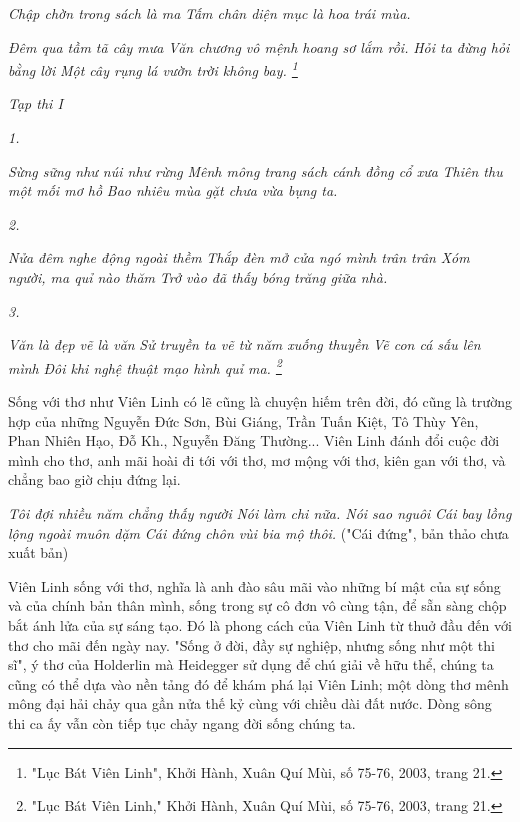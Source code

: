 \documentclass[../main.tex]{subfiles}
\begin{document}
\begin{multicols}{2}
\textit{Chập chờn trong sách là ma} 
\textit{Tấm chân diện mục là hoa trái mùa.} 

\textit{Đêm qua tầm tã cây mưa} 
\textit{Văn chương vô mệnh hoang sơ lắm rồi.} 
\textit{Hỏi ta đừng hỏi bằng lời} 
\textit{Một cây rụng lá vườn trời không bay. \footnote{
"Lục Bát Viên Linh", Khởi Hành, Xuân Quí Mùi, số 75-76, 2003, trang 21.} }

\textit{Tạp thi I} 

\textit{1.} 

\textit{Sừng sững như núi như rừng} 
\textit{Mênh mông trang sách cánh đồng cổ xưa} 
\textit{Thiên thu một mối mơ hồ} 
\textit{Bao nhiêu mùa gặt chưa vừa bụng ta.} 

\textit{2.} 

\textit{Nửa đêm nghe động ngoài thềm} 
\textit{Thắp đèn mở cửa ngó mình trân trân} 
\textit{Xóm người, ma quỉ nào thăm} 
\textit{Trở vào đã thấy bóng trăng giữa nhà.} 

\textit{3.} 

\textit{Văn là đẹp vẽ là văn} 
\textit{Sử truyền ta vẽ từ năm xuống thuyền} 
\textit{Vẽ con cá sấu lên mình} 
\textit{Đôi khi nghệ thuật mạo hình quỉ ma. \footnote{
"Lục Bát Viên Linh," Khởi Hành, Xuân Quí Mùi, số 75-76, 2003, trang 21.} }

Sống với thơ như Viên Linh có lẽ cũng là chuyện hiếm trên đời, đó cũng là trường hợp của những Nguyễn Đức Sơn, Bùi Giáng, Trần Tuấn Kiệt, Tô Thùy Yên, Phan Nhiên Hạo, Đỗ Kh., Nguyễn Đăng Thường... Viên Linh đánh đổi cuộc đời mình cho thơ, anh mãi hoài đi tới với thơ, mơ mộng với thơ, kiên gan với thơ, và chẳng bao giờ chịu đứng lại. 

\textit{Tôi đợi nhiều năm chẳng thấy người} 
\textit{Nói làm chi nữa. Nói sao nguôi} 
\textit{Cái bay lồng lộng ngoài muôn dặm} 
\textit{Cái đứng chôn vùi bia mộ thôi.} 
("Cái đứng", bản thảo chưa xuất bản) 

Viên Linh sống với thơ, nghĩa là anh đào sâu mãi vào những bí mật của sự sống và của chính bản thân mình, sống trong sự cô đơn vô cùng tận, để sẵn sàng chộp bắt ánh lửa của sự sáng tạo. Đó là phong cách của Viên Linh từ thuở đầu đến với thơ cho mãi đến ngày nay. "Sống ở đời, đầy sự nghiệp, nhưng sống như một thi sĩ", ý thơ của Holderlin mà Heidegger sử dụng để chú giải về hữu thể, chúng ta cũng có thể dựa vào nền tảng đó để khám phá lại Viên Linh; một dòng thơ mênh mông đại hải chảy qua gần nửa thế kỷ cùng với chiều dài đất nước. Dòng sông thi ca ấy vẫn còn tiếp tục chảy ngang đời sống chúng ta. 


\end{multicols}
\end{document}
